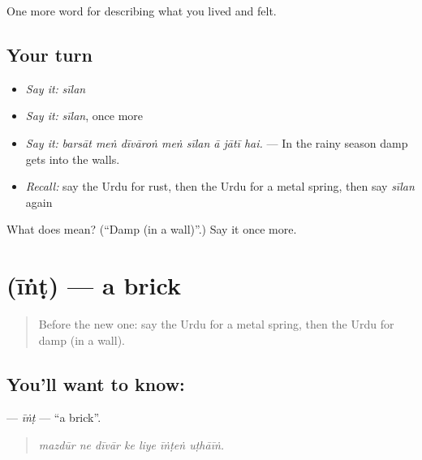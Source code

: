 \begin{grammarlens}[title={What you've built}]
One more word for describing what you lived and felt.
\end{grammarlens}

\subsection*{Your turn}
\begin{itemize}
\raggedright
  \item \emph{Say it:} \emph{sīlan}
  \item \emph{Say it:} \emph{sīlan}, once more
  \item \emph{Say it:} \emph{barsāt meṅ dīvāroṅ meṅ sīlan ā jātī hai.} — In the rainy season damp gets into the walls.
  \item \emph{Recall:} say the Urdu for rust, then the Urdu for a metal spring, then say \emph{sīlan} again
\end{itemize}

\begin{tcolorbox}[breakable,colback=teal!4,colframe=teal!35!black,title={Before you move on}]
What does  mean? (\textquotedblleft{}Damp (in a wall)\textquotedblright{}.) Say it once more.
\end{tcolorbox}
\section[\texorpdfstring{\ur{اینٹ} (īṅṭ)}{اینٹ (īṅṭ)}]{ (īṅṭ) — a brick}

\label{lesson:UR-C503-int}



\begin{quote}
Before the new one: say the Urdu for a metal spring, then the Urdu for damp (in a wall).
\end{quote}

\subsection*{You'll want to know: }
\textbf{} — \emph{īṅṭ} — \textquotedblleft{}a brick\textquotedblright{}.

\begin{quote}
      
\end{quote}

\begin{quote}
\emph{mazdūr ne dīvār ke liye īṅṭeṅ uṭhāīṅ.}
\end{quote}

